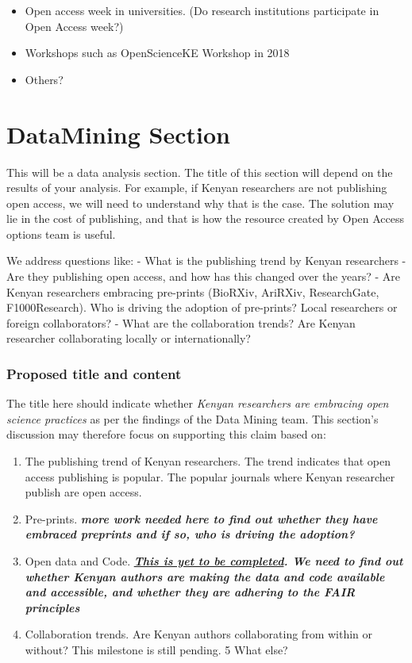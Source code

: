 \begin{itemize}
\tightlist
\item
  Open access week in universities. (Do research institutions
  participate in Open Access week?)
\item
  Workshops such as OpenScienceKE Workshop in 2018
\item
  Others?
\end{itemize}

\section*{DataMining Section}\label{datamining-section}

This will be a data analysis section. The title of this section will
depend on the results of your analysis. For example, if Kenyan
researchers are not publishing open access, we will need to understand
why that is the case. The solution may lie in the cost of publishing,
and that is how the resource created by Open Access options team is
useful.

We address questions like: - What is the publishing trend by Kenyan
researchers - Are they publishing open access, and how has this changed
over the years? - Are Kenyan researchers embracing pre-prints (BioRXiv,
AriRXiv, ResearchGate, F1000Research). Who is driving the adoption of
pre-prints? Local researchers or foreign collaborators? - What are the
collaboration trends? Are Kenyan researcher collaborating locally or
internationally?

\subsubsection{Proposed title and
content}\label{proposed-title-and-content}

The title here should indicate whether \emph{Kenyan researchers are
embracing open science practices} as per the findings of the Data Mining
team. This section's discussion may therefore focus on supporting this
claim based on:

\begin{enumerate}
\def\labelenumi{\arabic{enumi}.}
\tightlist
\item
  The publishing trend of Kenyan researchers. The trend indicates that
  open access publishing is popular. The popular journals where Kenyan
  researcher publish are open access.
\item
  Pre-prints. \textbf{\emph{more work needed here to find out whether
  they have embraced preprints and if so, who is driving the adoption?}}
\item
  Open data and Code.
  \textbf{\emph{\href{https://github.com/BioinfoNet/Data-mining/issues/11}{This
  is yet to be completed}. We need to find out whether Kenyan authors
  are making the data and code available and accessible, and whether
  they are adhering to the FAIR principles}}
\item
  Collaboration trends. Are Kenyan authors collaborating from within or
  without? This milestone is still pending. 5 What else?
\end{enumerate}

